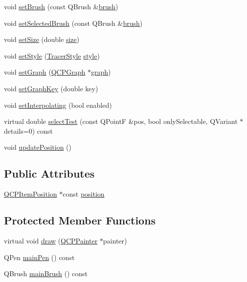 \begin{DoxyCompactItemize}
void \hyperlink{class_q_c_p_item_tracer_a2c303f7470a30084daa201ed556b3c36}{set\+Brush} (const Q\+Brush \&\hyperlink{class_q_c_p_item_tracer_af07527750cfb6afc3c0ba4bec012011f}{brush})
\item 
void \hyperlink{class_q_c_p_item_tracer_a0f55c084980a7a312af859d3e7b558ef}{set\+Selected\+Brush} (const Q\+Brush \&\hyperlink{class_q_c_p_item_tracer_af07527750cfb6afc3c0ba4bec012011f}{brush})
\item 
void \hyperlink{class_q_c_p_item_tracer_ae47fe0617f5fef5fdb766999569be10a}{set\+Size} (double \hyperlink{class_q_c_p_item_tracer_a2607fcb3d01e90773ea1532fd6803760}{size})
\item 
void \hyperlink{class_q_c_p_item_tracer_a41a2ac4f1acd7897b4e2a2579c03204e}{set\+Style} (\hyperlink{class_q_c_p_item_tracer_a2f05ddb13978036f902ca3ab47076500}{Tracer\+Style} \hyperlink{class_q_c_p_item_tracer_a871832dace1709f877c3136fac7ae1ec}{style})
\item 
void \hyperlink{class_q_c_p_item_tracer_af5886f4ded8dd68cb4f3388f390790c0}{set\+Graph} (\hyperlink{class_q_c_p_graph}{Q\+C\+P\+Graph} $\ast$\hyperlink{class_q_c_p_item_tracer_a74c90da0e6730839b8d7cf6445a4ec1f}{graph})
\item 
void \hyperlink{class_q_c_p_item_tracer_a6840143b42f3b685cedf7c6d83a704c8}{set\+Graph\+Key} (double key)
\item 
void \hyperlink{class_q_c_p_item_tracer_a6c244a9d1175bef12b50afafd4f5fcd2}{set\+Interpolating} (bool enabled)
\item 
virtual double \hyperlink{class_q_c_p_item_tracer_ae71f3728421c83c188c117279ca050fd}{select\+Test} (const Q\+Point\+F \&pos, bool only\+Selectable, Q\+Variant $\ast$details=0) const 
\item 
void \hyperlink{class_q_c_p_item_tracer_a5b90296109e36384aedbc8908a670413}{update\+Position} ()
\end{DoxyCompactItemize}
\subsection*{Public Attributes}
\begin{DoxyCompactItemize}
\item 
\hyperlink{class_q_c_p_item_position}{Q\+C\+P\+Item\+Position} $\ast$const \hyperlink{class_q_c_p_item_tracer_a69917e2fdb2b3a929c196958feee7cbe}{position}
\end{DoxyCompactItemize}
\subsection*{Protected Member Functions}
\begin{DoxyCompactItemize}
\item 
virtual void \hyperlink{class_q_c_p_item_tracer_aaaf49b48382c730ec9be0e74c2538315}{draw} (\hyperlink{class_q_c_p_painter}{Q\+C\+P\+Painter} $\ast$painter)
\item 
Q\+Pen \hyperlink{class_q_c_p_item_tracer_af87132b7698d5bb35c96a8a0b9e7180e}{main\+Pen} () const 
\item 
Q\+Brush \hyperlink{class_q_c_p_item_tracer_aaf4e72e2d87f53279b9f9ba624961bf5}{main\+Brush} () const 
\end{DoxyCompactItemize}
